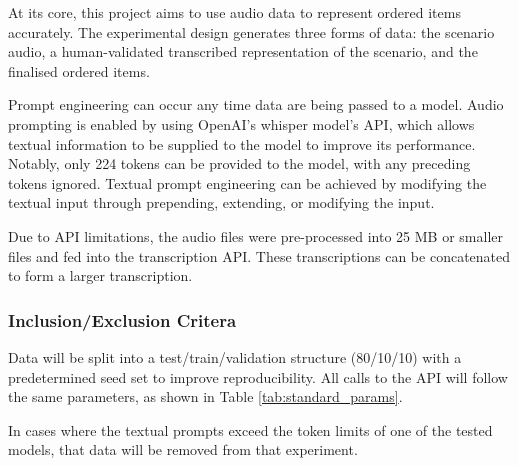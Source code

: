 At its core, this project aims to use audio data to represent ordered items accurately. The experimental design generates three forms of data: the scenario audio, a human-validated transcribed representation of the scenario, and the finalised ordered items.

Prompt engineering can occur any time data are being passed to a model. Audio prompting is enabled by using OpenAI's whisper model's API, which allows textual information to be supplied to the model to improve its performance. Notably, only 224 tokens can be provided to the model, with any preceding tokens ignored. Textual prompt engineering can be achieved by modifying the textual input through prepending, extending, or modifying the input.  


Due to API limitations, the audio files were pre-processed into 25 MB or smaller files and fed into the transcription API. These transcriptions can be concatenated to form a larger transcription.

\subsubsection{Inclusion/Exclusion Critera}
Data will be split into a test/train/validation structure (80/10/10) with a predetermined seed set to improve reproducibility. All calls to the API will follow the same parameters, as shown in Table \ref{tab:standard_params}.

In cases where the textual prompts exceed the token limits of one of the tested models, that data will be removed from that experiment.